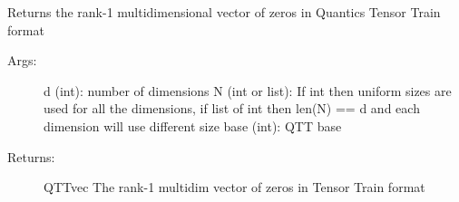 \documentclass[a4paper,10pt,english]{sphinxmanual}
\begin{document}
\begin{fulllineitems}
\label{api-core:TensorToolbox.core.QTTzerosvec}
Returns the rank-1 multidimensional vector of zeros in Quantics Tensor Train format
\begin{description}
\item[{Args:}] \leavevmode
d (int): number of dimensions
N (int or list): If int then uniform sizes are used for all the dimensions, if list of int then len(N) == d and each dimension will use different size
base (int): QTT base

\item[{Returns:}] \leavevmode
QTTvec The rank-1 multidim vector of zeros in Tensor Train format

\end{description}

\end{fulllineitems}

\end{document}
